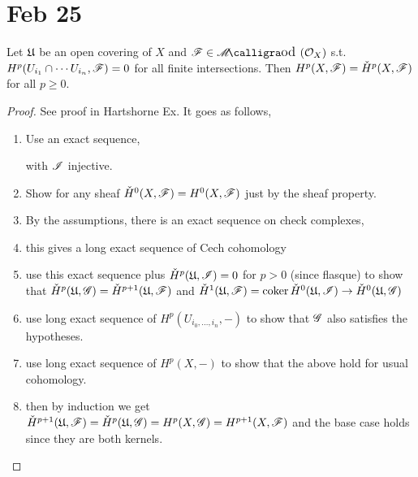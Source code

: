 \documentclass[12pt]{article}
\begin{document}
\section{Feb 25}

\begin{lemma}
Let $\mathfrak{U}$ be an open covering of $X$ and $\F \in \shMod{\struct{X}}$ s.t. $H^p(U_{i_1} \cap \cdots U_{i_{n}}, \mathscr{F}) = 0$ for all finite intersections. Then $H^p(X, \mathscr{F}) = \check{H}^p(X, \mathscr{F})$ for all $p \ge 0$.
\end{lemma}

\begin{proof}
See proof in Hartshorne Ex. It goes as follows,
\begin{enumerate}
\item Use an exact sequence,
\begin{center}
\end{center}
with $\mathscr{I}$ injective.
\item Show for any sheaf $\check{H}^0(X,\mathscr{F}) = H^0(X, \mathscr{F})$ just by the sheaf property.
\item By the assumptions, there is an exact sequence on check complexes,
\begin{center}
\end{center}
\item this gives a long exact sequence of Cech cohomology
\item use this exact sequence plus $\check{H}^p(\mathfrak{U}, \mathscr{I}) = 0$ for $p > 0$ (since flasque) to show that $\check{H}^p(\mathfrak{U}, \mathscr{G}) = \check{H}^{p+1}(\mathfrak{U}, \mathscr{F})$ and $\check{H}^1(\mathfrak{U}, \mathscr{F}) = \operatorname{\mathrm{coker}}{\check{H}^0(\mathfrak{U}, \mathscr{I}) \to \check{H}^0(\mathfrak{U}, \mathscr{G})}$
\item use long exact sequence of $H^p(U_{i_0, \dots, i_n}, -)$ to show that $\mathscr{G}$ also satisfies the hypotheses.
\item use long exact sequence of $H^p(X, -)$ to show that the above hold for usual cohomology.
\item then by induction we get $\check{H}^{p+1}(\mathfrak{U}, \mathscr{F}) = \check{H}^p(\mathfrak{U}, \mathscr{G}) = H^p(X, \mathscr{G}) = H^{p+1}(X, \mathscr{F})$ and the base case holds since they are both kernels.
\end{enumerate}
\end{proof}
\end{document}
